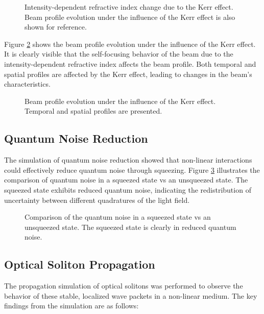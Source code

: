 \documentclass[12pt]{article}
\begin{document}
\begin{figure}[!ht]
    \centering
    
    \caption{Intensity-dependent refractive index change due to the Kerr effect. Beam profile evolution under the influence of the Kerr effect is also shown for reference.}
    \label{fig:kerr_index}
\end{figure}

Figure \ref{fig:kerr_beam} shows the beam profile evolution under the influence of the Kerr effect. It is clearly visible that the self-focusing behavior of the beam due to the intensity-dependent refractive index affects the beam profile. Both temporal and spatial profiles are affected by the Kerr effect, leading to changes in the beam's characteristics.

\begin{figure}[!ht]
    \centering
    
    \caption{Beam profile evolution under the influence of the Kerr effect. Temporal and spatial profiles are presented.}
    \label{fig:kerr_beam}
\end{figure}

\subsection{Quantum Noise Reduction}

The simulation of quantum noise reduction showed that non-linear interactions could effectively reduce quantum noise through squeezing. Figure \ref{fig:quantum_noise} illustrates the comparison of quantum noise in a squeezed state vs an unsqueezed state. The squeezed state exhibits reduced quantum noise, indicating the redistribution of uncertainty between different quadratures of the light field.

\begin{figure}[!ht]
    \centering
    
    \caption{Comparison of the quantum noise in a squeezed state vs an unsqueezed state. The squeezed state is clearly in reduced quantum noise.}
    \label{fig:quantum_noise}
\end{figure}

\subsection{Optical Soliton Propagation}

The propagation simulation of optical solitons was performed to observe the behavior of these stable, localized wave packets in a non-linear medium. The key findings from the simulation are as follows:
\end{document}
